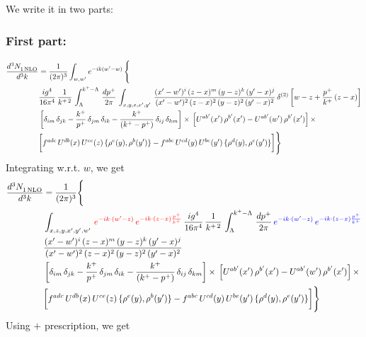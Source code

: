 \documentclass[9pt]{article}
\numberwithin{equation}{section}
\begin{document}
We write it in two parts:
\subsubsection{First part:}
\begin{align}
    \frac{d^{3}N_{1\,\rm NLO}^{\rm}}{d^{3}k}  & = \frac{1}{(2\pi)^{3}}  \int_{w, w^\prime} e^{-ik(w^\prime-w)}\, \Bigg\{\notag \\ & \frac{ig^{4}}{16\pi^{4}}\, \frac{1}{k^{+\,2}}\,\int_{\Lambda}^{k^{+}-\Lambda}\, \frac{dp^{+}}{2\pi}\,\int_{x,y,z,x',y'}\,\frac{(x'-w')^{i}\,(z-x)^{m}\,(y-z)^{k}\,(y'-x)^{j}}{(x'-w')^{2}\,(z-x)^{2}\,(y-z)^{2}\,(y'-x)^{2}}\, \delta^{(2)}\left[w-z+\frac{p^{+}}{k^{+}}\,(z-x)\right]\notag \\ & \left[\delta_{im}\,\delta_{jk}-\frac{k^{+}}{p^{+}}\, \delta_{jm}\,\delta_{ik}-\frac{k^{+}}{(k^{+}-p^{+})}\, \delta_{ij}\,\delta_{km}\right]\times\, \left[U^{ab'}(x')\,\rho^{b'}(x')-U^{ab'}(w')\,\rho^{b'}(x')\right]\times\notag \\ & \bigg[f^{adc}\,U^{db}(x)\,U^{ce}(z)\, \{\rho^{e}(y),\rho^{b}(y')\}-f^{abc}\,U^{cd}(y)\,U^{be}(y')\, \{\rho^{d}(y),\rho^{e}(y')\}\bigg]\Bigg\}
\end{align}
Integrating w.r.t. $w$, we get
\begin{align}
     \frac{d^{3}N_{1\,\rm NLO}^{\rm}}{d^{3}k}  & = \frac{1}{(2\pi)^{3}} \Bigg\{\notag \\ &  \int_{x,z,y,x',y'{\color{blue},}w'}\,{\color{red}e^{-ik\cdot (w^\prime-z)}\,e^{-ik\cdot (z-x)\frac{p^{+}}{k^{+}}}}\,\frac{ig^{4}}{16\pi^{4}}\, \frac{1}{k^{+\,2}}\,\int_{\Lambda}^{k^{+}-\Lambda}\, \frac{dp^{+}}{2\pi}\,{\color{blue}e^{-ik\cdot (w^\prime-z)}\,e^{-ik\cdot (z-x)\frac{p^{+}}{k^{+}}}}\notag \\ & \frac{(x'-w')^{i}\,(z-x)^{m}\,(y-z)^{k}\,(y'-x)^{j}}{(x'-w')^{2}\,(z-x)^{2}\,(y-z)^{2}\,(y'-x)^{2}}\,\notag \\ & \left[\delta_{im}\,\delta_{jk}-\frac{k^{+}}{p^{+}}\, \delta_{jm}\,\delta_{ik}-\frac{k^{+}}{(k^{+}-p^{+})}\, \delta_{ij}\,\delta_{km}\right]\times\, \left[U^{ab'}(x')\,\rho^{b'}(x')-U^{ab'}(w')\,\rho^{b'}(x')\right]\times\notag \\ & \bigg[f^{adc}\,U^{db}(x)\,U^{ce}(z)\, \{\rho^{e}(y),\rho^{b}(y')\}-f^{abc}\,U^{cd}(y)\,U^{be}(y')\, \{\rho^{d}(y),\rho^{e}(y')\}\bigg]\Bigg\}
\end{align}
Using $+$ prescription, we get
\end{document}

